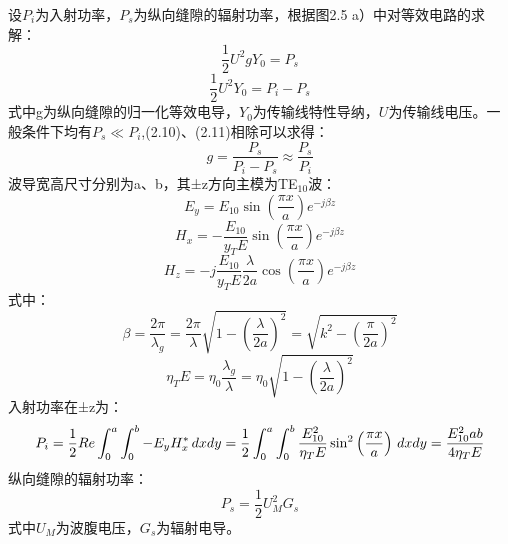     设$P_i$为入射功率，$P_s$为纵向缝隙的辐射功率，根据图2.5 a）中对等效电路的求解：
\begin{equation}
    \frac{1}{2} U^2 g Y_0 = P_s
\end{equation}
\begin{equation}
    \frac{1}{2} U^2 Y_0 = P_i-P_s
\end{equation}
    式中g为纵向缝隙的归一化等效电导，$Y_0$为传输线特性导纳，$U$为传输线电压。一般条件下均有$P_s \ll P_i$,(2.10)、(2.11)相除可以求得：
\begin{equation}
    g = \frac{P_s}{P_i-P_s} \approx \frac{P_s}{P_i}
\end{equation}
    波导宽高尺寸分别为a、b，其±z方向主模为TE$_{10}$波：
\begin{equation}
    E_y=E_10 \sin\left(\frac{\pi x}{a}\right) e^{-j\beta z}
\end{equation}
\begin{equation}
    H_x=-\frac{E_10}{y_TE}\sin\left(\frac{\pi x}{a}\right) e^{-j\beta z}
\end{equation}
\begin{equation}
    H_z=-j\frac{E_10}{y_TE}\frac{\lambda}{2 a}\cos\left(\frac{\pi x}{a}\right) e^{-j\beta z}
\end{equation}
    式中：
\begin{equation}
    \beta=\frac{2\pi}{\lambda_g}=\frac{2\pi}{\lambda}\sqrt{1-\left(\frac{\lambda}{2a}\right)^2}=\sqrt{k^2-\left(\frac{\pi}{2a}\right)^2}
\end{equation}
\begin{equation}
   \eta_TE=\eta_0 \frac{\lambda_g}{\lambda}=\eta_0\sqrt{1-\left(\frac{\lambda}{2a}\right)^2}
\end{equation}
    入射功率在±z为：
\begin{equation}
    P_i=\frac{1}{2} Re \int_0^a \int_0^b - E_y H_x^{*}\, dxdy\\
    =\frac{1}{2}\int_0^a \int_0^b\frac{E_{10}^{2}}{\eta_TE}\sin^{2}\left(\frac{\pi x}{a}\right)\, dxdy
    =\frac{E_{10}^{2}ab}{4\eta_TE}
\end{equation}
纵向缝隙的辐射功率：
\begin{equation}
    P_s=\frac{1}{2}U_M^2 G_s
\end{equation}
式中$U_M$为波腹电压，$G_s$为辐射电导。

